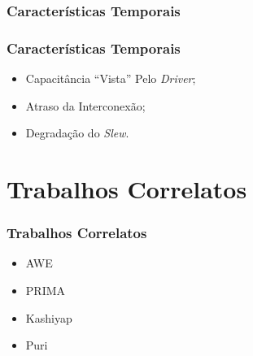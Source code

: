 \documentclass[10pt,a4paper]{beamer}
\begin{document}
			\subsubsection*{Características Temporais}
			\begin{frame}
				\frametitle{Características Temporais}
				
				
					\begin{figure}
						
					\end{figure}
					
					\begin{itemize}
						\item Capacitância ``Vista'' Pelo \textit{Driver};
						\item Atraso da Interconexão;
						\item Degradação do \textit{Slew}. 		
					\end{itemize}
			\end{frame}
	
	\section{Trabalhos Correlatos}
	
		\begin{frame}
		\frametitle{Trabalhos Correlatos}
			\begin{itemize}
				\item<1> AWE
				\item<1> PRIMA
				\item<1> Kashiyap
				\item<1> Puri
			\end{itemize}
		\end{frame}
	
\end{document}
